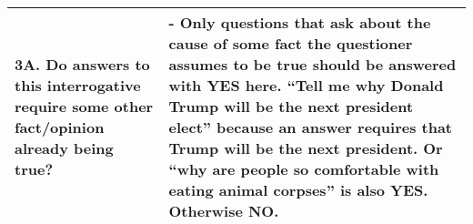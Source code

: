 \documentclass{article}
\begin{document}
{\begin{tabular}{p{5.5cm} p{12.5cm}}
\textbf{3A.} Do answers to this interrogative require some other fact/opinion already being true? & 
- Only questions that ask about the cause of some fact the questioner assumes to be true should be answered with YES here. “Tell me why Donald Trump will be the next president elect” because an answer requires that Trump will be the next president. Or “why are people so comfortable with eating animal corpses” is also YES. Otherwise NO. \\

\bottomrule
\end{tabular}
}
\end{document}
